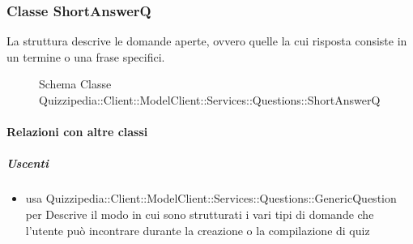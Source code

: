 \subsubsection{Classe ShortAnswerQ}
La struttura descrive le domande aperte, ovvero quelle la cui risposta consiste in un termine o una frase specifici.
\begin{figure}[H]
\centering
\noindent{}
\caption[Schema Classe ShortAnswerQ]{Schema Classe Quizzipedia::Client::ModelClient::Services::Questions::ShortAnswerQ}
\end{figure}
\paragraph{Relazioni con altre classi}
\subparagraph{Uscenti}
\begin{itemize}
\item usa Quizzipedia::Client::ModelClient::Services::Questions::GenericQuestion per Descrive il modo in cui sono strutturati i vari tipi di domande che l'utente può incontrare durante la creazione o la compilazione di quiz
\end{itemize}
